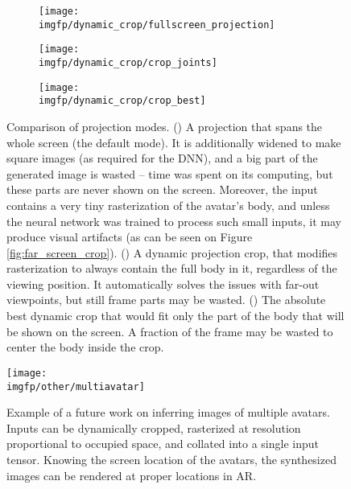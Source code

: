\begin{figure}
	\centering
	\begin{subfigure}[b]{0.45\textwidth}
		\centering
		\texttt{[image: \\imgfp/dynamic\_crop/fullscreen\_projection]}%
		\caption{}
		\label{fig:explain_crop_fullscreen}
	\end{subfigure}
	\hfill
	\begin{subfigure}[b]{0.27\textwidth}
		\centering
		\texttt{[image: \\imgfp/dynamic\_crop/crop\_joints]}
		\caption{}
		\label{fig:explain_crop_joints}
	\end{subfigure}
	\hfill
	\begin{subfigure}[b]{0.25\textwidth}
		\centering
		\texttt{[image: \\imgfp/dynamic\_crop/crop\_best]}
		\caption{}
		\label{fig:explain_crop_best}
	\end{subfigure}
	\caption{Comparison of projection modes. (\protect{}) A projection that spans the whole screen (the default mode). It is additionally widened to make square images (as required for the DNN), and a big part of the generated image is wasted -- time was spent on its computing, but these parts are never shown on the screen. Moreover, the input contains a very tiny rasterization of the avatar's body, and unless the neural network was trained to process such small inputs, it may produce visual artifacts (as can be seen on Figure \ref{fig:far_screen_crop}). (\protect{}) A dynamic projection crop, that modifies rasterization to always contain the full body in it, regardless of the viewing position. It automatically solves the issues with far-out viewpoints, but still frame parts may be wasted. (\protect{}) The absolute best dynamic crop that would fit only the part of the body that will be shown on the screen. A fraction of the frame may be wasted to center the body inside the crop. }
\end{figure}
\begin{figure}
	\centering%
	\setlength\abovedisplayskip{0pt}%
	\texttt{[image: \\imgfp/other/multiavatar]}%
	\caption{Example of a future work on inferring images of multiple avatars. Inputs can be dynamically cropped, rasterized at resolution proportional to occupied space, and collated into a single input tensor. Knowing the screen location of the avatars, the synthesized images can be rendered at proper locations in AR.}%
	\label{fig:multiavatar}%
	\setlength\belowdisplayskip{0pt}%
\end{figure}

